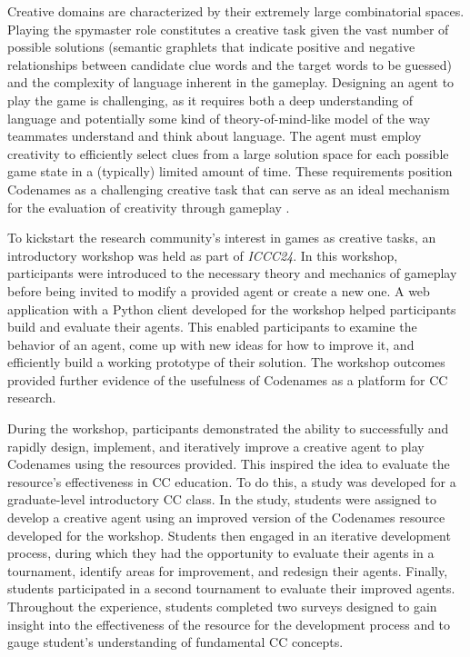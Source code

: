 \documentclass[phd,electronic,oneside,twosidetoc,letterpaper,chaptercenter,parttop,lof]{byumsphd}
\begin{document}
Creative domains are characterized by their extremely large combinatorial spaces. Playing the spymaster role constitutes a creative task given the vast number of possible solutions (semantic graphlets that indicate positive and negative relationships between candidate clue words and the target words to be guessed) and the complexity of language inherent in the gameplay. Designing an agent to play the game is challenging, as it requires both a deep understanding of language and potentially some kind of theory-of-mind-like model of the way teammates understand and think about language.  The agent must employ creativity to efficiently select clues from a large solution space for each possible game state in a (typically) limited amount of time. These requirements position Codenames as a challenging creative task that can serve as an ideal mechanism for the evaluation of creativity through gameplay \cite{spendlove2023}.

To kickstart the research community's interest in games as creative tasks, an introductory workshop was held as part of \emph{ICCC24}. In this workshop, participants were introduced to the necessary theory and mechanics of gameplay before being invited to modify a provided agent or create a new one. A web application with a Python client developed for the workshop helped participants build and evaluate their agents. This enabled participants to examine the behavior of an agent, come up with new ideas for how to improve it, and efficiently build a working prototype of their solution. The workshop outcomes provided further evidence of the usefulness of Codenames as a platform for CC research.

During the workshop, participants demonstrated the ability to successfully and rapidly design, implement, and iteratively improve a creative agent to play Codenames using the resources provided. This inspired the idea to evaluate the resource’s effectiveness in CC education. To do this, a study was developed for a graduate-level introductory CC class. In the study, students were assigned to develop a creative agent using an improved version of the Codenames resource developed for the workshop. Students then engaged in an iterative development process, during which they had the opportunity to evaluate their agents in a tournament, identify areas for improvement, and redesign their agents. Finally, students participated in a second tournament to evaluate their improved agents. Throughout the experience, students completed two surveys designed to gain insight into the effectiveness of the resource for the development process and to gauge student’s understanding of fundamental CC concepts. 
    
\end{document}
